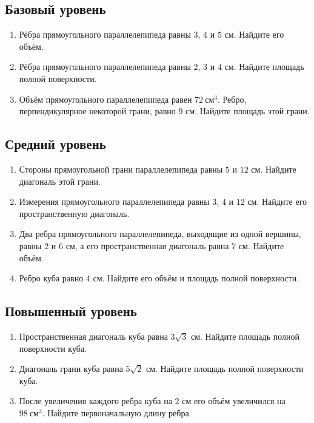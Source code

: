 \documentclass[a4paper,11pt]{article}
\begin{document}
\subsection*{Базовый уровень}
\begin{enumerate}[label=\textbf{\arabic*.},itemsep=8pt]
\item Рёбра прямоугольного параллелепипеда равны $3$, $4$ и $5$ см. Найдите его объём.
\item Рёбра прямоугольного параллелепипеда равны $2$, $3$ и $4$ см. Найдите площадь полной поверхности.
\item Объём прямоугольного параллелепипеда равен $72\ \text{см}^3$. Ребро, перпендикулярное некоторой грани, равно $9$ см. Найдите площадь этой грани.
\end{enumerate}
\subsection*{Средний уровень}
\begin{enumerate}[label=\textbf{\arabic*.},start=4,itemsep=8pt]
\item Стороны прямоугольной грани параллелепипеда равны $5$ и $12$ см. Найдите диагональ этой грани.
\item Измерения прямоугольного параллелепипеда равны $3$, $4$ и $12$ см. Найдите его пространственную диагональ.
\item Два ребра прямоугольного параллелепипеда, выходящие из одной вершины, равны $2$ и $6$ см, а его пространственная диагональ равна $7$ см. Найдите объём.
\item Ребро куба равно $4$ см. Найдите его объём и площадь полной поверхности.
\end{enumerate}
\subsection*{Повышенный уровень}
\begin{enumerate}[label=\textbf{\arabic*.},start=8,itemsep=8pt]
\item Пространственная диагональ куба равна $3\sqrt{3}$ см. Найдите площадь полной поверхности куба.
\item Диагональ грани куба равна $5\sqrt{2}$ см. Найдите площадь полной поверхности куба.
\item После увеличения каждого ребра куба на $2$ см его объём увеличился на $98\ \text{см}^3$. Найдите первоначальную длину ребра.
\end{enumerate}
\clearpage
\end{document}
